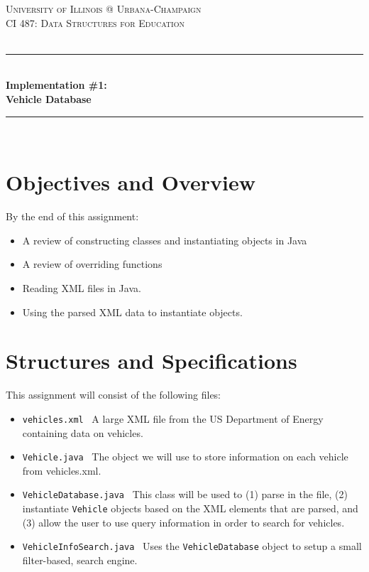 \documentclass[a4paper]{article}
\begin{document}
\begin{titlepage}

\newcommand{\HRule}{\rule{\linewidth}{0.5mm}} 							%
\center 
 
\textsc{\LARGE University of Illinois @ Urbana-Champaign}\\[1cm]

\textsc{\Large CI 487: Data Structures for Education}\\[0.2cm]
\textsc{\large }\\[1cm] 										%
\HRule \\[0.8cm]
{ \huge \bfseries Implementation \#1:\\\vspace{0.1cm}Vehicle Database}\\[0.7cm]								%
\HRule \\[0.8cm]
\vfill
\vfill 
\end{titlepage}

\section{Objectives and Overview}

By the end of this assignment:
\begin{itemize}
  \item A review of constructing classes and instantiating objects in Java
  \item A review of overriding functions
  \item Reading XML files in Java.
  \item Using the parsed XML data to instantiate objects.
\end{itemize}

\section{Structures and Specifications}

This assignment will consist of the following files:
\begin{itemize}
  \item \lstinline|vehicles.xml| \textrightarrow\ A large XML file from the US Department of Energy containing data on vehicles.
  \item \lstinline|Vehicle.java| \textrightarrow \ The object we will use to store information on each vehicle from vehicles.xml.
  \item \lstinline|VehicleDatabase.java| \textrightarrow\ This class will be used to (1) parse in the file, (2) instantiate \lstinline|Vehicle| objects based on the XML elements that are parsed, and (3) allow the user to use query information in order to search for vehicles.
  \item \lstinline|VehicleInfoSearch.java| \textrightarrow\ Uses the \lstinline|VehicleDatabase| object to setup a small filter-based, search engine. 
\end{itemize}
\end{document}
